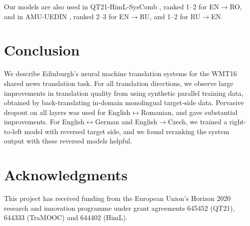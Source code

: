 \documentclass[11pt]{article}
\begin{document}
Our models are also used in QT21-HimL-SysComb \cite{qt21syscomb2016}, ranked 1--2 for EN$\to$RO, and in AMU-UEDIN \cite{junczys2016}, ranked 2--3 for EN$\to$RU, and 1--2 for RU$\to$EN.

\section{Conclusion}

We describe Edinburgh's neural machine translation systems for the WMT16 shared news translation task.
For all translation directions, we observe large improvements in translation quality from using synthetic parallel training data, obtained by back-translating in-domain monolingual target-side data.
Pervasive dropout on all layers was used for English$\leftrightarrow$Romanian, and gave substantial improvements.
For English$\leftrightarrow$German and English$\to$Czech, we trained a right-to-left model with reversed target side, and we found reranking the system output with these reversed models helpful.

\section*{Acknowledgments}

This project has received funding from the European Union's Horizon 2020 research and innovation
programme under grant agreements 645452 (QT21), 644333 (TraMOOC) and 644402 (HimL).



\end{document}
